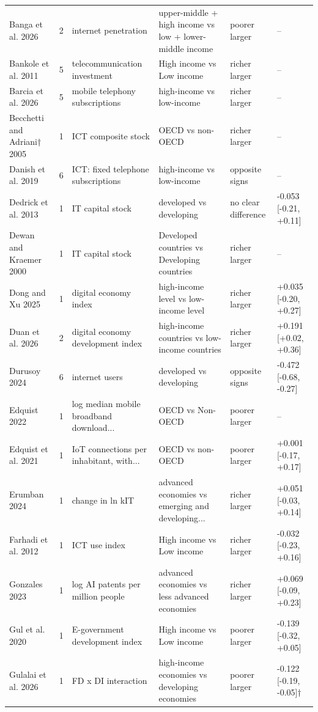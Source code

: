 {\begin{longtable}{@{}p{3.0cm} p{0.4cm} p{3.3cm} p{3.7cm} p{1.8cm} p{2.9cm}@{}}
Banga et al. 2026 & 2 & internet penetration & upper-middle + high income vs low + lower-middle income & poorer larger & --\\
Bankole et al. 2011 & 5 & telecommunication investment & High income vs Low income & richer larger & --\\
Barcia et al. 2026 & 5 & mobile telephony subscriptions & high-income vs low-income & richer larger & --\\
Becchetti and Adriani† 2005 & 1 & ICT composite stock & OECD vs non-OECD & richer larger & --\\
Danish et al. 2019 & 6 & ICT: fixed telephone subscriptions & high-income vs low-income & opposite signs & --\\
Dedrick et al. 2013 & 1 & IT capital stock & developed vs developing & no clear difference & -0.053 [-0.21, +0.11]\\
Dewan and Kraemer 2000 & 1 & IT capital stock & Developed countries vs Developing countries & richer larger & --\\
Dong and Xu 2025 & 1 & digital economy index & high-income level vs low-income level & richer larger & +0.035 [-0.20, +0.27]\\
Duan et al. 2026 & 2 & digital economy development index & high-income countries vs low-income countries & richer larger & +0.191 [+0.02, +0.36]\\
Durusoy 2024 & 6 & internet users & developed vs developing & opposite signs & -0.472 [-0.68, -0.27]\\
Edquist 2022 & 1 & log median mobile broadband download... & OECD vs Non-OECD & poorer larger & --\\
Edquist et al. 2021 & 1 & IoT connections per inhabitant, with... & OECD vs non-OECD & poorer larger & +0.001 [-0.17, +0.17]\\
Erumban 2024 & 1 & change in ln kIT & advanced economies vs emerging and developing... & richer larger & +0.051 [-0.03, +0.14]\\
Farhadi et al. 2012 & 1 & ICT use index & High income vs Low income & richer larger & -0.032 [-0.23, +0.16]\\
Gonzales 2023 & 1 & log AI patents per million people & advanced economies vs less advanced economies & richer larger & +0.069 [-0.09, +0.23]\\
Gul et al. 2020 & 1 & E-government development index & High income vs Low income & poorer larger & -0.139 [-0.32, +0.05]\\
Gulalai et al. 2026 & 1 & FD x DI interaction & high-income economies vs developing economies & poorer larger & -0.122 [-0.19, -0.05]$\dagger$\\

\end{longtable}}
